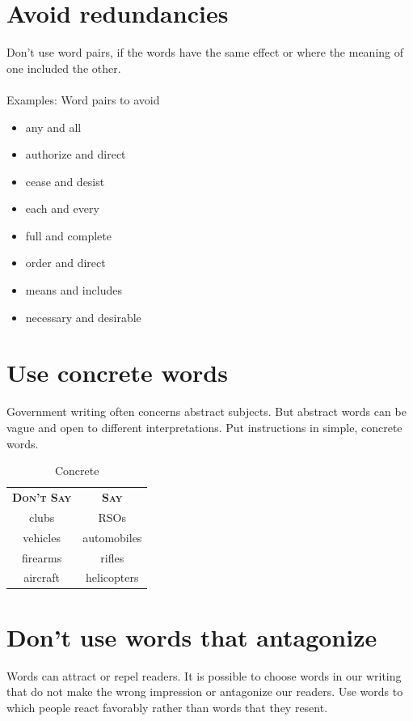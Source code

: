 \documentclass[12pt, letterpaper]{report}
\begin{document}
\begin{linenumbers}
    \section{Avoid redundancies}
     Don't use word pairs, if the words have the same effect or where the meaning of one included the other.\\\\
    Examples: Word pairs to avoid 
    \begin{itemize}
        \item any and all
        \item authorize and direct
        \item cease and desist
        \item each and every
        \item full and complete
        \item order and direct
        \item means and includes
        \item necessary and desirable
    \end{itemize}
    \section{Use concrete words}
    Government writing often concerns abstract subjects. But abstract words can be vague and open to different interpretations. Put instructions in simple, concrete words. \\
        \begin{table}[h]
        \centering
        \begin{tabular}{c|c}
           \textsc{\textbf{Don't Say}}  &  \textsc{\textbf{Say}}\\
            clubs & RSOs\\
            vehicles & automobiles\\
            firearms & rifles\\
            aircraft & helicopters
        \end{tabular}
        \caption{Concrete }
        \label{tab:concrete}
    \end{table}
    \section{Don't use words that antagonize}
    Words can attract or repel readers. It is possible to choose words in our writing that do not make the wrong impression or antagonize our readers. Use words to which people react favorably rather than words that they resent. 
    \begin{multicols}
    \hphantom{}

\end{multicols}
\end{linenumbers}
\end{document}
